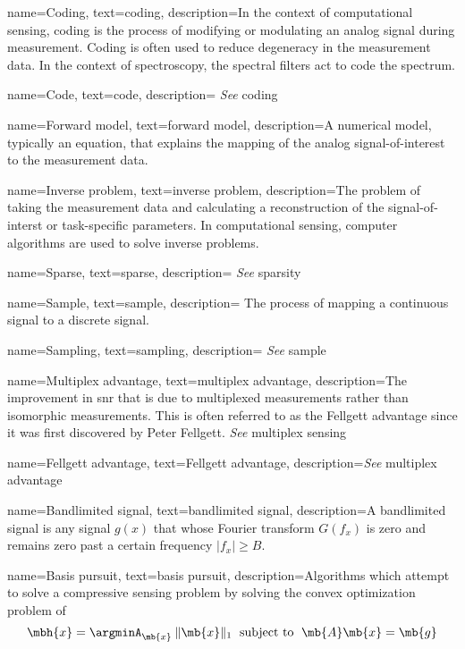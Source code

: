 {
name={Coding},
text={coding},
description={In the context of computational sensing, coding is the process of modifying or modulating an analog signal during measurement. Coding is often used to reduce degeneracy in the measurement data. In the context of spectroscopy, the spectral filters act to code the spectrum.  }
}

{
name={Code},
text={code},
description={ \emph{See} \gls{coding}}
}

{
name={Forward model},
text={forward model},
description={A numerical model, typically an equation, that explains the mapping of the analog signal-of-interest to the measurement data.}
}

{
name={Inverse problem},
text={inverse problem},
description={The problem of taking the measurement data and calculating a reconstruction of the signal-of-interst or task-specific parameters. In computational sensing, computer algorithms are used to solve inverse problems.}
}

{
name={Sparse},
text={sparse},
description={ \emph{See} \gls{sparsity}}
}

{
name={Sample},
text={sample},
description={ The process of mapping a continuous signal to a discrete signal.  }
}

{
name={Sampling},
text={sampling},
description={ \emph{See} \gls{sample}  }
}



{
name={Multiplex advantage},
text={multiplex advantage},
description={The improvement in \gls{snr} that is due to multiplexed measurements rather than isomorphic measurements. This is often referred to as the Fellgett advantage since it was first discovered by Peter Fellgett. \emph{See} \gls{multiplex sensing}} 
}

{
name={Fellgett advantage},
text={Fellgett advantage},
description={\emph{See} \gls{multiplex advantage}} 
}

{
name={Bandlimited signal},
text={bandlimited signal},
description={A bandlimited signal is any signal $ g(x) $ that whose Fourier transform $ G(f_x) $ is zero and remains zero past a certain frequency $ \lvert f_x \rvert \geq B$.} 
}

{
name={Basis pursuit},
text={basis pursuit},
description={Algorithms which attempt to solve a compressive sensing problem by solving the convex optimization problem of 
\begin{equation}
	\mbh{x} = \argminA_{\mb{x}} \: \| \mb{x} \|_{1} \text{\; subject to \;} \mb{A}\mb{x} = \mb{g}
\end{equation} 
}
}

